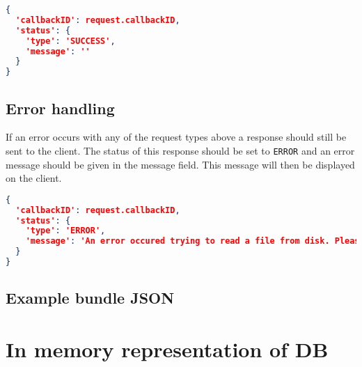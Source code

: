 \documentclass[A4,12pt, utf8]{article}
\begin{document}
\begin{lstlisting}[caption=Reply content, language=json]
{
  'callbackID': request.callbackID,
  'status': {
    'type': 'SUCCESS',
    'message': ''
  }
}
\end{lstlisting}


\subsection{Error handling}

If an error occurs with any of the request types above a response should still be sent to the client. The status of this response should be set to \texttt{ERROR} and an error message should be given in the message field. This message will then be displayed on the client.

\begin{lstlisting}[caption=ERROR reply content, language=json]
{
  'callbackID': request.callbackID,
  'status': {
    'type': 'ERROR',
    'message': 'An error occured trying to read a file from disk. Please make sure: /path/to/file exists or check the config...
  }
}
\end{lstlisting}

\subsection{Example bundle JSON}



\section{In memory representation of DB}
\end{document}
